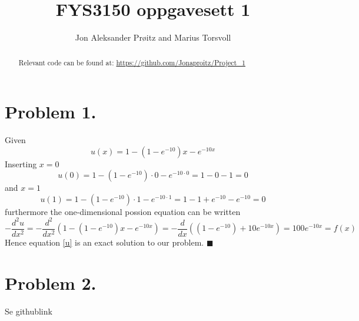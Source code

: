 \documentclass[english,notitlepage]{revtex4-1}  %
\begin{document}
\title{FYS3150 oppgavesett 1}

\author{Jon Aleksander Prøitz and Marius Torsvoll}

\begin{abstract}
\noindent Relevant code can be found at:
\url{https://github.com/Jonaproitz/Project_1}
\end{abstract}

\maketitle


\section*{Problem 1.}
    \label{sec:oppgave1}
    Given
    \begin{equation}
            u(x) 
        =   1-(1-e^{-10})x - e^{-10x}
        \label{u}
    \end{equation}
    Inserting $x = 0$ 
    \begin{equation*}
            u(0)
        =   1 - (1 - e^{-10}) \cdot 0 - e^{-10 \cdot 0}
        =   1 - 0 - 1
        =   0
    \end{equation*}
    and $x = 1$
    \begin{equation*}
            u(1)
        =   1 - (1 - e^{-10}) \cdot 1 - e^{-10 \cdot 1}
        =   1 - 1 + e^{-10} - e^{-10}
        =   0
    \end{equation*}
    furthermore the one-dimensional possion equation can be written
    \begin{equation*}
            -\frac{d^2 u}{d x^2} 
        =   -\frac{d^2}{d x^2}\left(1-(1-e^{-10})x - e^{-10x}\right)
        =   -\frac{d}{d x}\left((1-e^{-10}) + 10e^{-10x} \right) 
        =   100e^{-10x}
        =   f(x)
    \end{equation*}
    Hence equation \ref{u} is an exact solution to our problem.
    \hfill$\blacksquare$


\section*{Problem 2.}
    \label{sec:oppgave2}
    Se githublink 
\end{document}
